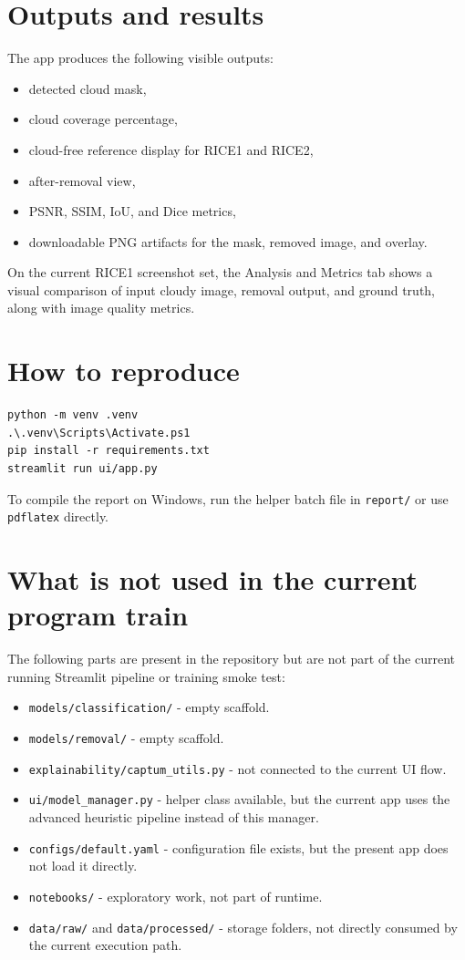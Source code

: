 \documentclass[11pt,a4paper]{article}
\begin{document}
\section{Outputs and results}
The app produces the following visible outputs:
\begin{itemize}
  \item detected cloud mask,
  \item cloud coverage percentage,
  \item cloud-free reference display for RICE1 and RICE2,
  \item after-removal view,
  \item PSNR, SSIM, IoU, and Dice metrics,
  \item downloadable PNG artifacts for the mask, removed image, and overlay.
\end{itemize}

On the current RICE1 screenshot set, the Analysis and Metrics tab shows a visual comparison of input cloudy image, removal output, and ground truth, along with image quality metrics.

\section{How to reproduce}
\begin{verbatim}
python -m venv .venv
.\.venv\Scripts\Activate.ps1
pip install -r requirements.txt
streamlit run ui/app.py
\end{verbatim}

To compile the report on Windows, run the helper batch file in \verb|report/| or use \verb|pdflatex| directly.

\section{What is not used in the current program train}
The following parts are present in the repository but are not part of the current running Streamlit pipeline or training smoke test:
\begin{itemize}
  \item \verb|models/classification/| - empty scaffold.
  \item \verb|models/removal/| - empty scaffold.
  \item \verb|explainability/captum_utils.py| - not connected to the current UI flow.
  \item \verb|ui/model_manager.py| - helper class available, but the current app uses the advanced heuristic pipeline instead of this manager.
  \item \verb|configs/default.yaml| - configuration file exists, but the present app does not load it directly.
  \item \verb|notebooks/| - exploratory work, not part of runtime.
  \item \verb|data/raw/| and \verb|data/processed/| - storage folders, not directly consumed by the current execution path.
\end{itemize}
\end{document}
